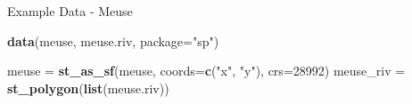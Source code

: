 \documentclass[11pt,ignorenonframetext,]{beamer}
\newenvironment{Shaded}{}{}
\newcommand{\KeywordTok}[1]{\textcolor[rgb]{0.00,0.44,0.13}{\textbf{#1}}}
\newcommand{\DataTypeTok}[1]{\textcolor[rgb]{0.56,0.13,0.00}{#1}}
\newcommand{\DecValTok}[1]{\textcolor[rgb]{0.25,0.63,0.44}{#1}}
\newcommand{\StringTok}[1]{\textcolor[rgb]{0.25,0.44,0.63}{#1}}
\newcommand{\OperatorTok}[1]{\textcolor[rgb]{0.40,0.40,0.40}{#1}}
\newcommand{\NormalTok}[1]{#1}
\let\oldShaded\Shaded
\let\endoldShaded\endShaded
\renewenvironment{Shaded}{\footnotesize\begin{spacing}{0.9}\oldShaded}{\endoldShaded\end{spacing}}
\let\oldverbatim\verbatim
\let\endoldverbatim\endverbatim
\newcommand{\scriptoutput}{
  \renewenvironment{Shaded}{\scriptsize\begin{spacing}{0.9}\oldShaded}{\endoldShaded\end{spacing}}
  \renewenvironment{verbatim}{\scriptsize\begin{spacing}{0.9}\oldverbatim}{\endoldverbatim\end{spacing}}
}
\begin{document}
\begin{frame}[fragile]{Example Data - Meuse}

\scriptoutput

\begin{Shaded}
\begin{Highlighting}[]
\KeywordTok{data}\NormalTok{(meuse, meuse.riv, }\DataTypeTok{package=}\StringTok{"sp"}\NormalTok{)}

\NormalTok{meuse =}\StringTok{ }\KeywordTok{st_as_sf}\NormalTok{(meuse, }\DataTypeTok{coords=}\KeywordTok{c}\NormalTok{(}\StringTok{"x"}\NormalTok{, }\StringTok{"y"}\NormalTok{), }\DataTypeTok{crs=}\DecValTok{28992}\NormalTok{)}
\NormalTok{meuse_riv =}\StringTok{ }\KeywordTok{st_polygon}\NormalTok{(}\KeywordTok{list}\NormalTok{(meuse.riv)) }\OperatorTok{%

}
\end{Highlighting}
\end{Shaded}
\end{frame}
\end{document}
